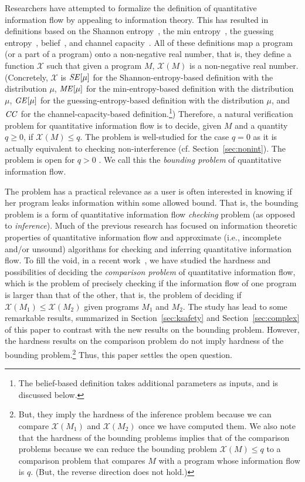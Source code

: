 \documentclass{llncs}
\begin{document}
Researchers have attempted to formalize the definition of quantitative
information flow by appealing to information theory.  This has
resulted in definitions based on the Shannon
entropy~\cite{denning82,clarkjcs2007,malacaria:popl2007}, the min
entropy~\cite{smith09}, the guessing
entropy~\cite{kopf07,DBLP:conf/sp/BackesKR09},
belief~\cite{clarkson:csf2005}, and channel
capacity~\cite{mccamant:pldi2008,malacaria08,NMS2009}.  All of these
definitions map a program (or a part of a program) onto a non-negative
real number, that is, they define a function $\mathcal{X}$ such that
given a program $M$, $\mathcal{X}(M)$ is a non-negative real number.
(Concretely, $\mathcal{X}$ is ${\it SE}[\mu]$ for the
Shannon-entropy-based definition with the distribution $\mu$, ${\it
  ME}[\mu]$ for the min-entropy-based definition with the distribution
$\mu$, ${\it GE}[\mu]$ for the guessing-entropy-based definition with
the distribution $\mu$, and ${\it CC}$ for the channel-capacity-based
definition.\footnote{The belief-based definition takes additional
  parameters as inputs, and is discussed below.})  Therefore, a
natural verification problem for quantitative information flow is to
decide, given $M$ and a quantity $q \geq 0$, if $\mathcal{X}(M) \leq
q$.  The problem is well-studied for the case $q = 0$ as it is
actually equivalent to checking non-interference
(cf. Section~\ref{sec:nonint}).  The problem is open for $q > 0$ .  We
call this the {\em bounding problem} of quantitative information flow.

The problem has a practical relevance as a user is often interested in
knowing if her program leaks information within some allowed bound.
That is, the bounding problem is a form of quantitative information
flow {\em checking} problem (as opposed to {\em inference}).  Much of
the previous research has focused on information theoretic properties
of quantitative information flow and approximate (i.e., incomplete
and/or unsound) algorithms for checking and inferring quantitative
information flow.  To fill the void, in a recent
work~\cite{DBLP:conf/csfw/yasuoka2010}, we have studied the hardness
and possibilities of deciding the {\em comparison problem} of
quantitative information flow, which is the problem of precisely
checking if the information flow of one program is larger than that of
the other, that is, the problem of deciding if $\mathcal{X}(M_1) \leq
\mathcal{X}(M_2)$ given programs $M_1$ and $M_2$.  The study has lead
to some remarkable results, summarized in Section~\ref{sec:ksafety}
and Section~\ref{sec:complex} of this paper to contrast with the new
results on the bounding problem.  However, the hardness results on the
comparison problem do not imply hardness of the bounding
problem.\footnote{But, they imply the hardness of the inference
  problem because we can compare $\mathcal{X}(M_1)$ and
  $\mathcal{X}(M_2)$ once we have computed them.  We also note
    that the hardness of the bounding problems implies that of the
    comparison problems because we can reduce the bounding problem
    $\mathcal{X}(M) \leq q$ to a comparison problem that compares $M$
    with a program whose information flow is $q$.  (But, the reverse
    direction does not hold.)}  Thus, this paper settles the open
question.
\end{document}
